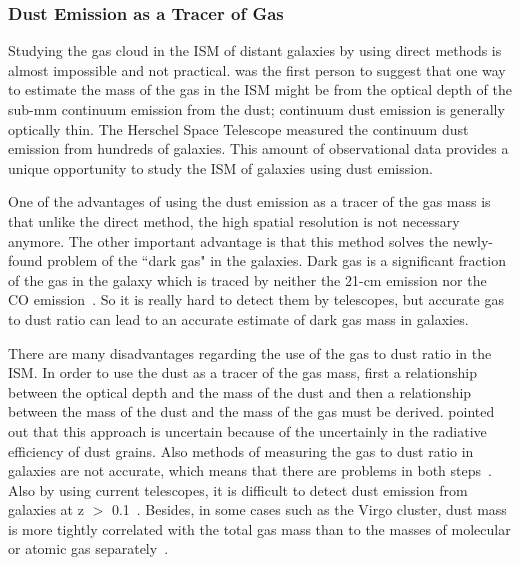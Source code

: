 \subsubsection{Dust Emission as a Tracer of Gas}

Studying the gas cloud in the ISM of distant galaxies by using direct methods is almost impossible and not practical. 
\cite{Hildebran83} was the first person to suggest that one way to estimate the mass of the gas in the ISM might be from the optical depth of the sub-mm continuum emission from the dust; continuum dust emission is generally optically thin. 
The Herschel Space Telescope \cite{Pilbratt10} measured the continuum dust emission from hundreds of galaxies\citep{Eales10, Oliver12}. 
This amount of observational data provides a unique opportunity to study the ISM of galaxies using dust emission. 

One of the advantages of using the dust emission as a tracer of the gas mass is that unlike the direct method, the high spatial resolution is not necessary anymore. 
The other important advantage is that this method solves the newly-found problem of the ``dark gas" in the galaxies. 
Dark gas is a significant fraction of the gas in the galaxy which is traced by neither the 21-cm emission nor the CO emission~\citep{Abdo10}. 
So it is really hard to detect them by telescopes, but accurate gas to dust ratio can lead to an accurate estimate of dark gas mass in galaxies. 

There are many disadvantages regarding the use of the gas to dust ratio in the ISM.
In order to use the dust as a tracer of the gas mass, first a relationship between the optical depth and the mass of the dust and then a relationship between the mass of the dust and the mass of the gas must be derived. \cite{Draine03} pointed out that this approach is uncertain because of the uncertainly in the radiative efficiency of dust grains. 
Also methods of measuring the gas to dust ratio in galaxies are not accurate, which means that there are problems in both steps~\citep{Hildebran83}. 
Also by using current telescopes, it is difficult to detect dust emission from galaxies at z $>$ 0.1~\citep{Ealas12}. 
Besides, in some cases such as the Virgo cluster, dust mass is more tightly correlated with the total gas mass than to the masses of molecular or atomic gas separately~\citep{Corbelli11}. 

